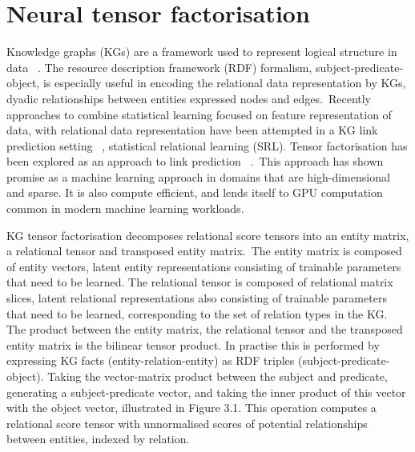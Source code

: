 \chapter{Neural tensor factorisation}


\ifpdf
     \graphicspath{{Figs/Chapter3/}}
\else
    \graphicspath{{Chapter3/Figs/Vector/}{Chapter3/Figs/}}
\fi

Knowledge graphs (KGs) are a framework used to represent logical structure in data \unskip ~\citep{koller2007introduction}. The resource description framework (RDF) formalism, subject-predicate-object, is especially useful in encoding the relational data representation by KGs, dyadic relationships between entities expressed nodes and edges.\ Recently approaches to combine statistical learning focused on feature representation of data, with relational data representation have been attempted in a KG link prediction setting \unskip~\citep{kazemi2018simple, chang2014typed, kang2012gigatensor}, statistical relational learning (SRL). Tensor factorisation has been explored as an approach to link prediction \unskip ~\citep{nickel2011three, bordes2013translating, trouillon2016complex}.\ This approach has shown promise as a machine learning approach in domains that are high-dimensional and sparse. It is also compute efficient, and lends itself to GPU computation common in modern machine learning workloads. \par

\noindent KG tensor factorisation decomposes relational score tensors into an entity matrix, a relational tensor and transposed entity matrix.\ The entity matrix is composed of entity vectors, latent entity representations consisting of trainable parameters that need to be learned. The relational tensor is composed of relational matrix slices, latent relational representations also consisting of trainable parameters that need to be learned, corresponding to the set of relation types in the KG. The product between the entity matrix, the relational tensor and the transposed entity matrix is the bilinear tensor product. In practise this is performed by expressing KG facts (entity-relation-entity) as RDF triples (subject-predicate-object). Taking the vector-matrix product between the subject and predicate, generating a subject-predicate vector, and taking the inner product of this vector with the object vector, illustrated in Figure 3.1. This operation computes a relational score tensor with unnormalised scores of potential relationships between entities, indexed by relation. \par

